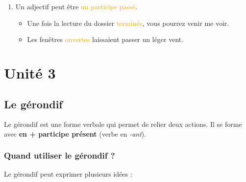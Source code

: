 \documentclass[math,code]{amznotes}
\theoremstyle{remark}
\begin{document}
\begin{enumerate}
    \begin{notebox}
        Qu'il soit placé avant ou après le nom, l'adjectif s'accorde \textbf{toujours} en genre et en nombre avec le nom (ou le sujet).
    \end{notebox}

    \item Un adjectif peut être \textcolor{orange}{un participe passé}.
    \begin{itemize}
        \item Une fois la lecture du dossier \textcolor{orange}{terminée}, vous pourrez venir me voir.
        \item Les fenêtres \textcolor{orange}{ouvertes} laissaient passer un léger vent.
    \end{itemize}
\end{enumerate}

\chapter{Unité 3}

\section{Le gérondif}

Le gérondif est une forme verbale qui permet de relier deux actions. Il se forme avec \textbf{en + participe présent} (verbe en \textit{-ant}).

\subsection*{Quand utiliser le gérondif ?}

Le gérondif peut exprimer plusieurs idées :
\end{document}
